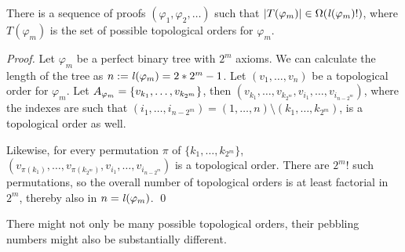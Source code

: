 \begin{theorem}
\label{theorem:enumeration}
There is a sequence of proofs $(\varphi_1,\varphi_2,\ldots)$ such that $|T(\varphi_m)| \in \Omega(\mathit{l}(\varphi_m)!)$, where $T(\varphi_m)$ is the set of possible topological orders for $\varphi_m$.
\end{theorem}
\begin{proof}
Let $\varphi_m$ be a perfect binary tree with $2^m$ axioms.
We can calculate the length of the tree as $n := \mathit{l}(\varphi_m) = 2*{2^m}-1$.
Let $(v_1,\ldots,v_n)$ be a topological order for $\varphi_m$. 
Let $A_{\varphi_m} = \{v_{k_1},\ldots,v_{k_{2^m}}\}$, then $(v_{k_1},\ldots,v_{k_{2^m}},v_{i_1},\ldots,v_{i_{n-{2^m}}})$, 
where the indexes are such that $(i_1,\ldots,i_{n-{2^m}}) = (1,\ldots,n) \setminus (k_1,\ldots,k_{2^m})$, is a topological order as well. 

Likewise, for every permutation $\pi$ of $\{k_1,\ldots,k_{2^m}\}$, $(v_{\pi({k_1})},\ldots,v_{\pi({k_{2^m}})},v_{i_1},\ldots,v_{i_{n-{2^m}}})$ is a topological order. 
There are ${2^m}!$ such permutations, so the overall number of topological orders is at least factorial in ${2^m}$, thereby also in $n = \mathit{l}(\varphi_m)$. \hspace*{\fill} \qed
\end{proof}

There might not only be many possible topological orders, their pebbling numbers might also be substantially different.

